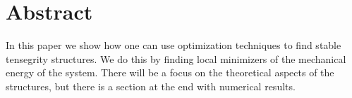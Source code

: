 \section{Abstract}
In this paper we show how one can use optimization techniques to find stable tensegrity structures. We do this by finding local minimizers of the mechanical energy of the system. There will be a focus on the theoretical aspects of the structures, but there is a section at the end with numerical results.